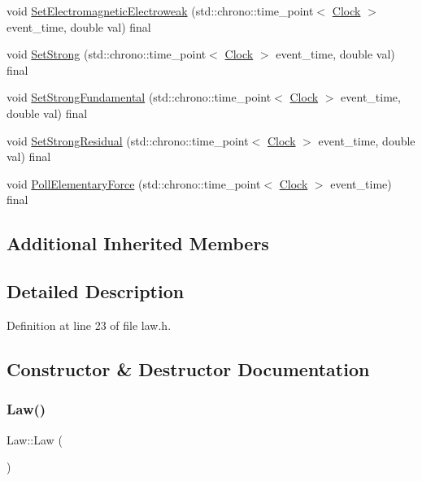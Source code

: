 \begin{DoxyCompactItemize}
\item 
void \hyperlink{class_law_aca9bb82839ddb46bd89f52b6211c5a54}{Set\+Electromagnetic\+Electroweak} (std\+::chrono\+::time\+\_\+point$<$ \hyperlink{universe_8h_a0ef8d951d1ca5ab3cfaf7ab4c7a6fd80}{Clock} $>$ event\+\_\+time, double val) final
\item 
void \hyperlink{class_law_a4cd0dd1908edbd02090dd1ba1387d722}{Set\+Strong} (std\+::chrono\+::time\+\_\+point$<$ \hyperlink{universe_8h_a0ef8d951d1ca5ab3cfaf7ab4c7a6fd80}{Clock} $>$ event\+\_\+time, double val) final
\item 
void \hyperlink{class_law_a4a7c8caa24acf453c1a8782a1ec4acf4}{Set\+Strong\+Fundamental} (std\+::chrono\+::time\+\_\+point$<$ \hyperlink{universe_8h_a0ef8d951d1ca5ab3cfaf7ab4c7a6fd80}{Clock} $>$ event\+\_\+time, double val) final
\item 
void \hyperlink{class_law_ad4a05c77d11ddec40b1e07246cac449d}{Set\+Strong\+Residual} (std\+::chrono\+::time\+\_\+point$<$ \hyperlink{universe_8h_a0ef8d951d1ca5ab3cfaf7ab4c7a6fd80}{Clock} $>$ event\+\_\+time, double val) final
\item 
void \hyperlink{class_law_af99520c95b2cd8af0af110b78b2288ef}{Poll\+Elementary\+Force} (std\+::chrono\+::time\+\_\+point$<$ \hyperlink{universe_8h_a0ef8d951d1ca5ab3cfaf7ab4c7a6fd80}{Clock} $>$ event\+\_\+time) final
\end{DoxyCompactItemize}
\subsection*{Additional Inherited Members}


\subsection{Detailed Description}


Definition at line 23 of file law.\+h.



\subsection{Constructor \& Destructor Documentation}
\mbox{\label{class_law_a3b94b6e9f09b8f457dba70f3b1c1ab43}} 
\subsubsection{\texorpdfstring{Law()}{Law()}\hspace{0.1cm}{\footnotesize\ttfamily [1/4]}}
{\footnotesize\ttfamily Law\+::\+Law (\begin{DoxyParamCaption}{ }\end{DoxyParamCaption})\hspace{0.3cm}{\ttfamily [inline]}}



